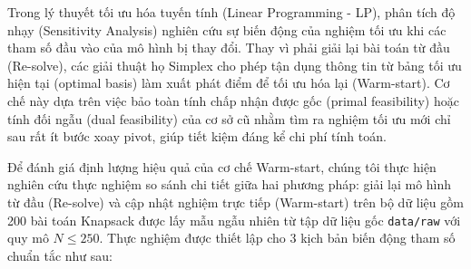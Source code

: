 \documentclass[fontsize=13pt,a4paper]{report}
\begin{document}
Trong lý thuyết tối ưu hóa tuyến tính (Linear Programming - LP), phân tích độ nhạy (Sensitivity Analysis) nghiên cứu sự biến động của nghiệm tối ưu khi các tham số đầu vào của mô hình bị thay đổi. Thay vì phải giải lại bài toán từ đầu (Re-solve), các giải thuật họ Simplex cho phép tận dụng thông tin từ bảng tối ưu hiện tại (optimal basis) làm xuất phát điểm để tối ưu hóa lại (Warm-start). Cơ chế này dựa trên việc bảo toàn tính chấp nhận được gốc (primal feasibility) hoặc tính đối ngẫu (dual feasibility) của cơ sở cũ nhằm tìm ra nghiệm tối ưu mới chỉ sau rất ít bước xoay pivot, giúp tiết kiệm đáng kể chi phí tính toán.

Để đánh giá định lượng hiệu quả của cơ chế Warm-start, chúng tôi thực hiện nghiên cứu thực nghiệm so sánh chi tiết giữa hai phương pháp: giải lại mô hình từ đầu (Re-solve) và cập nhật nghiệm trực tiếp (Warm-start) trên bộ dữ liệu gồm 200 bài toán Knapsack được lấy mẫu ngẫu nhiên từ tập dữ liệu gốc \texttt{data/raw} với quy mô $N \le 250$. Thực nghiệm được thiết lập cho 3 kịch bản biến động tham số chuẩn tắc như sau:
\end{document}
